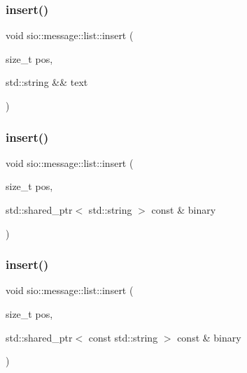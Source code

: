 \mbox{\label{classsio_1_1message_1_1list_a7d0ab6d30e2381d0d0b8ae69ce68926a}} 
\subsubsection{\texorpdfstring{insert()}{insert()}\hspace{0.1cm}{\footnotesize\ttfamily [3/5]}}
{\footnotesize\ttfamily void sio\+::message\+::list\+::insert (\begin{DoxyParamCaption}\item[{size\+\_\+t}]{pos,  }\item[{std\+::string \&\&}]{text }\end{DoxyParamCaption})\hspace{0.3cm}{\ttfamily [inline]}}

\mbox{\label{classsio_1_1message_1_1list_af5eefe06e865dcf24ef0912b61a868c3}} 
\subsubsection{\texorpdfstring{insert()}{insert()}\hspace{0.1cm}{\footnotesize\ttfamily [4/5]}}
{\footnotesize\ttfamily void sio\+::message\+::list\+::insert (\begin{DoxyParamCaption}\item[{size\+\_\+t}]{pos,  }\item[{std\+::shared\+\_\+ptr$<$ std\+::string $>$ const \&}]{binary }\end{DoxyParamCaption})\hspace{0.3cm}{\ttfamily [inline]}}

\mbox{\label{classsio_1_1message_1_1list_a8d3941008fd93e9fc068f07192912f4d}} 
\subsubsection{\texorpdfstring{insert()}{insert()}\hspace{0.1cm}{\footnotesize\ttfamily [5/5]}}
{\footnotesize\ttfamily void sio\+::message\+::list\+::insert (\begin{DoxyParamCaption}\item[{size\+\_\+t}]{pos,  }\item[{std\+::shared\+\_\+ptr$<$ const std\+::string $>$ const \&}]{binary }\end{DoxyParamCaption})\hspace{0.3cm}{\ttfamily [inline]}}

